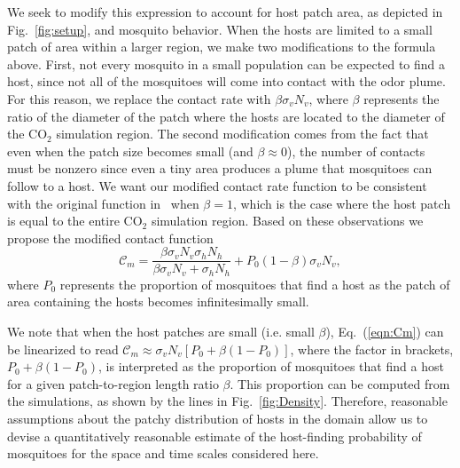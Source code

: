 \documentclass[10pt]{article}
\begin{document}
We seek to modify this expression to account for host patch area, as depicted in Fig.~\ref{fig:setup}, and mosquito behavior.  When the hosts are limited to a small patch of area within a larger region, we make two modifications to the formula above.  First, not every mosquito in a small population can be expected to find a host, since not all of the mosquitoes will come into contact with the odor plume.  For this reason, we replace the contact rate with $\beta\sigma_v N_v$, where $\beta$ represents the ratio of the diameter of the patch where the hosts are located to the diameter of the CO$_2$ simulation region.   The second modification comes from the fact that even when the patch size becomes small (and $\beta\approx0$), the number of contacts must be nonzero since even a tiny area produces a plume that mosquitoes can follow to a host. 
We want our modified contact rate function to be consistent with the original function in~\cite{Chitnis2006} when
$\beta=1$, which is the case where the host patch is equal to the entire CO$_2$ simulation region. 
Based on these observations we propose the modified contact function
\begin{equation}
	\mathcal{C}_m 	= \frac{\beta\sigma_v N_v\sigma_h N_h}{\beta\sigma_v N_v + \sigma_h N_h} + P_0(1-\beta)\sigma_v N_v, \label{eqn:Cm}
\end{equation}
where $P_0$ represents the proportion of
mosquitoes that find a host as the patch of area containing the
hosts becomes infinitesimally small.

We note that when the host patches are small (i.e. small $\beta$), Eq.~(\ref{eqn:Cm}) can
be linearized to read $\mathcal{C}_m \approx \sigma_v N_v [ P_0 + \beta(1-P_0) ]$, where
the factor in brackets, $P_0 + \beta(1-P_0)$, is interpreted as the proportion of mosquitoes 
that find a host for a given patch-to-region length ratio $\beta$.  This proportion can be computed from the 
simulations, as shown by the lines in Fig.~\ref{fig:Density}.
Therefore, reasonable assumptions about the patchy distribution of hosts in the domain allow us to devise a quantitatively reasonable estimate of the host-finding probability of mosquitoes for the space and time scales considered here. 
\end{document}
